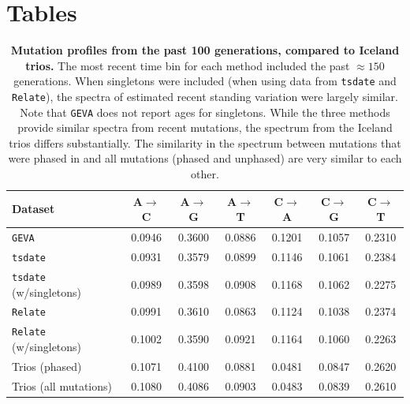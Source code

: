 \documentclass[]{article}
\begin{document}
\clearpage

\section{Tables}

\begin{table}[h]
    \caption{
        \label{tab:recent-spectra}
        \textbf{Mutation profiles from the past 100 generations,
        compared to Iceland trios.}
        The most recent time bin for each method included the past $\approx150$
        generations. When singletons were included (when using data from
        \texttt{tsdate} and \texttt{Relate}), the spectra of estimated
        recent standing variation were largely similar. Note that \texttt{GEVA}
        does not report ages for singletons.
        While the three methods provide similar spectra from recent mutations,
        the spectrum from the Iceland trios differs substantially.
        The similarity in the spectrum between mutations that were phased
        in \citet{jonsson2017parental} and all mutations (phased and unphased)
        are very similar to each other.
    }
    \centering
    \begin{tabular}[t]{l|cccccc}
        \toprule
        Dataset & A$\rightarrow$C & A$\rightarrow$G & A$\rightarrow$T &
            C$\rightarrow$A & C$\rightarrow$G & C$\rightarrow$T \\
        \midrule
        \texttt{GEVA} & 0.0946 & 0.3600 & 0.0886 & 0.1201 & 0.1057 & 0.2310 \\
        \texttt{tsdate} & 0.0931 & 0.3579 & 0.0899 & 0.1146 & 0.1061 & 0.2384 \\
        \texttt{tsdate} (w/singletons) & 0.0989 & 0.3598 & 0.0908 & 0.1168 & 0.1062 & 0.2275 \\
        \texttt{Relate} & 0.0991 & 0.3610 & 0.0863 & 0.1124 & 0.1038 & 0.2374 \\
        \texttt{Relate} (w/singletons) & 0.1002 & 0.3590 & 0.0921 & 0.1164 & 0.1060 & 0.2263 \\
        \midrule
        Trios (phased) & 0.1071 & 0.4100 & 0.0881 & 0.0481 & 0.0847 & 0.2620 \\
        Trios (all mutations) & 0.1080 & 0.4086 & 0.0903 & 0.0483 & 0.0839 & 0.2610 \\
        \bottomrule
    \end{tabular}
\end{table}

\clearpage



\end{document}
